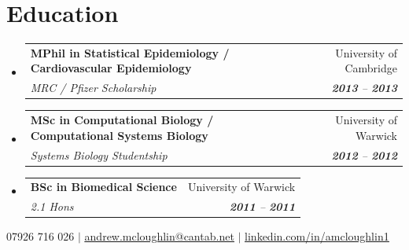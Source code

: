 \documentclass[letterpaper,11pt]{article}
\makeatletter
\newcommand{\resumeSubheading}[4]{
  \vspace{-2pt}\item
    \begin{tabular*}{0.97\textwidth}[t]{l@{\extracolsep{\fill}}r}
      \textbf{#1} & #2 \\
      \textit{\small#3} & \textit{\small #4} \\
    \end{tabular*}\vspace{-7pt}
}
\newcommand{\resumeSubHeadingListStart}{\begin{itemize}[leftmargin=0.15in, label={}]}
\newcommand{\resumeSubHeadingListEnd}{\end{itemize}}
\makeatother
\begin{document}
\section{Education}
  \resumeSubHeadingListStart
    \resumeSubheading
      {MPhil in Statistical Epidemiology / Cardiovascular Epidemiology}{University of Cambridge}
      {\textit{MRC / Pfizer Scholarship}}{\textbf{2013} -- \textbf{2013}}
\vspace{1mm}
    \resumeSubheading
      {MSc in Computational Biology / Computational Systems Biology}{University of Warwick}
      {\textit{Systems Biology Studentship}}{\textbf{2012} -- \textbf{2012}}
\vspace{1mm}
    \resumeSubheading
      {BSc in Biomedical Science}{University of Warwick}
      {\textit{2.1 Hons}}{\textbf{2011} -- \textbf{2011}}
  \resumeSubHeadingListEnd
  

\vspace{3mm}

\begin{center}
\small 07926 716 026 $|$
\href{mailto:andrew.mcloughlin@cantab.net}{\underline{andrew.mcloughlin@cantab.net}} $|$
\href{https://linkedin.com/in/amcloughlin1}{\underline{linkedin.com/in/amcloughlin1}}
\end{center}
\end{document}
